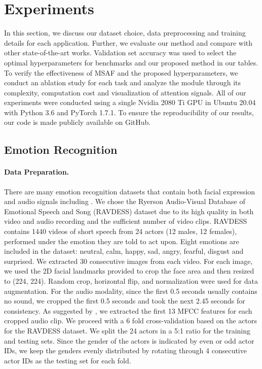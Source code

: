 \documentclass[10pt,twocolumn,letterpaper]{article}
\begin{document}
\section{Experiments}
In this section, we discuss our dataset choice, data preprocessing and training details for each application. Further, we evaluate our method and compare with other state-of-the-art works. Validation set accuracy was used to select the optimal hyperparameters for benchmarks and our proposed method in our tables. To verify the effectiveness of MSAF and the proposed hyperparameters, we conduct an ablation study for each task and analyze the module through its complexity, computation cost and visualization of attention signals. All of our experiments were conducted using a single Nvidia 2080 Ti GPU in Ubuntu 20.04 with Python 3.6 and PyTorch 1.7.1. To ensure the reproducibility of our results, our code is made publicly available on GitHub.

\subsection{Emotion Recognition}
\paragraph{Data Preparation.}
There are many emotion recognition datasets that contain both facial expression and audio signals including \cite{Livingstone2018TheRA, li2020spontaneous}. We chose the Ryerson Audio-Visual Database of Emotional Speech and Song (RAVDESS) \cite{Livingstone2018TheRA} dataset due to its high quality in both video and audio recording and the sufficient number of video clips. RAVDESS contains 1440 videos of short speech from 24 actors (12 males, 12 females), performed under the emotion they are told to act upon. Eight emotions are included in the dataset: neutral, calm, happy, sad, angry, fearful, disgust and surprised. We extracted 30 consecutive images from each video. For each image, we used the 2D facial landmarks provided to crop the face area and then resized to (224, 224). Random crop, horizontal flip, and normalization were used for data augmentation. For the audio modality, since the first 0.5 seconds usually contains no sound, we cropped the first 0.5 seconds and took the next 2.45 seconds for consistency. As suggested by \cite{jin2015speech}, we extracted the first 13 MFCC features for each cropped audio clip. We proceed with a 6 fold cross-validation based on the actors for the RAVDESS dataset. We split the 24 actors in a 5:1 ratio for the training and testing sets. Since the gender of the actors is indicated by even or odd actor IDs, we keep the genders evenly distributed by rotating through 4 consecutive actor IDs as the testing set for each fold.
\end{document}
